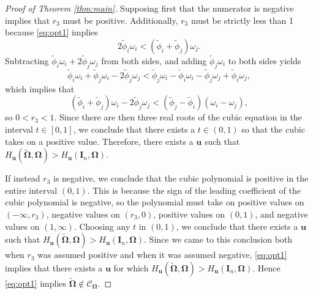 \documentclass[12pt]{article}
\newcommand{\bl}[1]{{\mathbf #1}}
\newcommand{\bs}[1]{\boldsymbol #1}
\begin{document}
\begin{proof}[Proof of Theorem \ref{thm:main}]
Supposing first that the numerator is negative implies that $r_3$ must be positive. Additionally, $r_3$ must be strictly less than 1 because \eqref{eq:opt1} implies
\begin{equation*}
    2 \tilde{\phi}_i \omega_i < (\tilde{\phi}_i + \tilde{\phi}_j) \omega_j .
\end{equation*}
Subtracting $\tilde{\phi}_i \omega_i + 2 \tilde{\phi}_j \omega_j$ from both sides, and adding $\tilde{\phi}_j \omega_i$ to both sides yields
\begin{equation*}
    \tilde{\phi}_i \omega_i + \tilde{\phi}_j \omega_i - 2\tilde{\phi}_j \omega_j < \tilde{\phi}_j \omega_i - \tilde{\phi}_i \omega_i - \tilde{\phi}_j \omega_j + \tilde{\phi}_i \omega_j,
\end{equation*}
which implies that
\begin{equation*}
    (\tilde{\phi}_i + \tilde{\phi}_j)\omega_i - 2 \tilde{\phi}_j\omega_j < (\tilde{\phi}_j - \tilde{\phi}_i)(\omega_i - \omega_j),
\end{equation*}
so $0 < r_3 < 1$. Since there are then three real roots of the cubic equation in the interval $t \in [0, 1]$, we conclude that there exists a $t \in (0, 1)$ so that the cubic takes on a positive value. Therefore, there exists a $\bl{u}$ such that $H_{\bl{u}}(\tilde{\bs{\Omega}}, \bs{\Omega}) > H_{\bl{u}}(\bl{I}_n, \bs{\Omega})$.

If instead $r_3$ is negative, we conclude that the cubic polynomial is positive in the entire interval $(0, 1)$. This is because the sign of the leading coefficient of the cubic polynomial is negative, so the polynomial must take on positive values on $(-\infty, r_3)$, negative values on $(r_3, 0)$, positive values on $(0, 1)$, and negative values on $(1, \infty)$. Choosing any $t$ in $(0, 1)$, we conclude that there exists a $\bl{u}$ such that $H_{\bl{u}}(\tilde{\bs{\Omega}}, \bs{\Omega}) > H_{\bl{u}}(\bl{I}_n, \bs{\Omega})$. Since we came to this conclusion both when $r_3$ was assumed positive and when it was assumed negative, \eqref{eq:opt1} implies that there exists a $\bl{u}$ for which $H_{\bl{u}}(\tilde{\bs{\Omega}}, \bs{\Omega}) > H_{\bl{u}}(\bl{I}_n, \bs{\Omega})$. Hence \eqref{eq:opt1} implies $\tilde{\bs{\Omega}} \notin \mathcal{C}_{\bs{\Omega}}$.


\end{proof}
\end{document}
